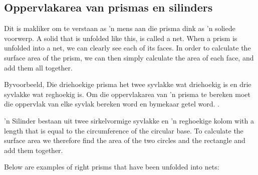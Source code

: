 \begin{figure}[H]
\begin{center}
	\vspace{0.75cm}
    \end{center}
\end{figure}   

\subsection{Oppervlakarea van prismas en silinders}

Dit is makliker om te verstaan as ’n mens aan die prisma dink as ’n soliede voorwerp.
A solid that is unfolded like this, is called a net. When a prism is unfolded into a net, we can clearly see each of its faces. In order to calculate the surface area of the prism, we can then simply calculate the area of each face, and add them all together.
\par 


Byvoorbeeld, Die driehoekige prisma het twee syvlakke wat driehoekig is en drie syvlakke wat reghoekig is. Om
die oppervlakarea van ’n prisma te bereken moet die oppervlak van elke syvlak bereken word en bymekaar getel
word.
.
  \par
’n Silinder bestaan uit twee sirkelvormige syvlakke en ’n reghoekige kolom with a length that is equal to the circumference of the circular base. To calculate the surface area we therefore find the area of the two circles and the rectangle and add them together.

\par
Below are examples of right prisms that have been unfolded into nets:

